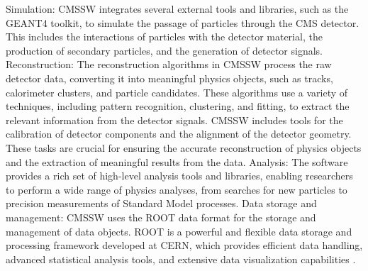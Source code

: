 \begin{itemize}
Simulation: CMSSW integrates several external tools and libraries, such as the GEANT4 toolkit, to simulate the passage of particles through the CMS detector. This includes the interactions of particles with the detector material, the production of secondary particles, and the generation of detector signals. Reconstruction: The reconstruction algorithms in CMSSW process the raw detector data, converting it into meaningful physics objects, such as tracks, calorimeter clusters, and particle candidates. These algorithms use a variety of techniques, including pattern recognition, clustering, and fitting, to extract the relevant information from the detector signals. CMSSW includes tools for the calibration of detector components and the alignment of the detector geometry. These tasks are crucial for ensuring the accurate reconstruction of physics objects and the extraction of meaningful results from the data. Analysis: The software provides a rich set of high-level analysis tools and libraries, enabling researchers to perform a wide range of physics analyses, from searches for new particles to precision measurements of Standard Model processes. Data storage and management: CMSSW uses the ROOT data format for the storage and management of data objects. ROOT is a powerful and flexible data storage and processing framework developed at CERN, which provides efficient data handling, advanced statistical analysis tools, and extensive data visualization capabilities \cite{CMSWorkBook}.


\end{itemize}
